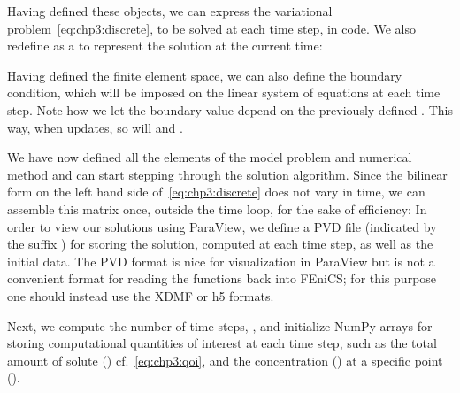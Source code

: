 \noindent Having defined these objects, we can express the variational
problem~\eqref{eq:chp3:discrete}, to be solved at each time step, in
code. We also redefine  as a
 to represent the solution at the current time:

\noindent Having defined the finite element space, we can also define
the boundary condition, which will be imposed on the linear system of
equations at each time step. 
\noindent Note how we let the boundary value
 depend on the previously defined
 . This way, when
 updates, so will  and
.

We have now defined all the elements of the model problem and
numerical method and can start stepping through the solution
algorithm. Since the bilinear form on the left hand side
of~\eqref{eq:chp3:discrete} does not vary in time, we can assemble
this matrix once, outside the time loop, for the sake of efficiency:  
%
%
In order to view our solutions using ParaView, we define a PVD file 
(indicated by the suffix ) for 
storing the solution, computed at each time step, as well as the initial data. 
\noindent %
The PVD format is nice for visualization in ParaView but is not a convenient 
format for reading the functions back into FEniCS; for this purpose one should
instead use the XDMF or h5 formats.

Next, we compute the number of time steps, , and initialize
NumPy arrays for storing computational quantities of interest at each
time step, such as the total amount of solute ()
cf.~\eqref{eq:chp3:qoi}, and the concentration ()
at a specific point ().

